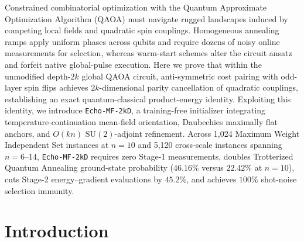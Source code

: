 \documentclass[10pt,a4paper]{article}
\begin{document}
\makencstitle


\begin{ncsabstract}

Constrained combinatorial optimization with the Quantum Approximate Optimization Algorithm (QAOA) must navigate rugged landscapes induced by competing local fields and quadratic spin couplings. Homogeneous annealing ramps apply uniform phases across qubits and require dozens of noisy online measurements for selection, whereas warm-start schemes alter the circuit ansatz and forfeit native global-pulse execution. Here we prove that within the unmodified depth-$2k$ global QAOA circuit, anti-symmetric cost pairing with odd-layer spin flips achieves $2k$-dimensional parity cancellation of quadratic couplings, establishing an exact quantum-classical product-energy identity. Exploiting this identity, we introduce \texttt{Echo-MF-2kD}, a training-free initializer integrating temperature-continuation mean-field orientation, Daubechies maximally flat anchors, and $O(kn)$ $\mathrm{SU}(2)$-adjoint refinement. Across 1,024 Maximum Weight Independent Set instances at $n=10$ and 5,120 cross-scale instances spanning $n=6\mbox{--}14$, \texttt{Echo-MF-2kD} requires zero Stage-1 measurements, doubles Trotterized Quantum Annealing ground-state probability ($46.16\%$ versus $22.42\%$ at $n=10$), cuts Stage-2 energy--gradient evaluations by $45.2\%$, and achieves $100\%$ shot-noise selection immunity.

\end{ncsabstract}

\section*{Introduction}
\end{document}
